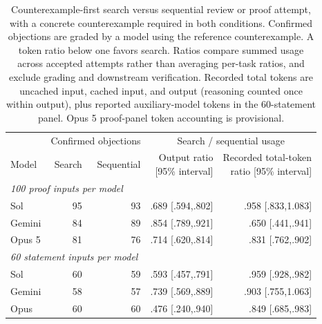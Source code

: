 \begin{table}[ht]
\centering\small\setlength{\tabcolsep}{4pt}
\begin{tabular}{@{}lrrrr@{}}
\toprule
 & \multicolumn{2}{c}{Confirmed objections} & \multicolumn{2}{c}{Search / sequential usage}\\
\cmidrule(lr){2-3}\cmidrule(l){4-5}
Model & Search & Sequential & \shortstack{Output ratio\\{[95\% interval]}} & \shortstack{Recorded total-token\\ratio {[95\% interval]}}\\
\midrule
\multicolumn{5}{l}{\emph{100 proof inputs per model}}\\
Sol & 95 & 93 & .689 [.594,.802] & .958 [.833,1.083]\\
Gemini & 84 & 89 & .854 [.789,.921] & .650 [.441,.941]\\
Opus 5 & 81 & 76 & .714 [.620,.814] & .831 [.762,.902]\\
\midrule
\multicolumn{5}{l}{\emph{60 statement inputs per model}}\\
Sol & 60 & 59 & .593 [.457,.791] & .959 [.928,.982]\\
Gemini & 58 & 57 & .739 [.569,.889] & .903 [.755,1.063]\\
Opus & 60 & 60 & .476 [.240,.940] & .849 [.685,.983]\\
\bottomrule
\end{tabular}
\caption{Counterexample-first search versus sequential review or proof attempt, with a concrete counterexample required in both conditions. Confirmed objections are graded by a model using the reference counterexample. A token ratio below one favors search. Ratios compare summed usage across accepted attempts rather than averaging per-task ratios, and exclude grading and downstream verification. Recorded total tokens are uncached input, cached input, and output (reasoning counted once within output), plus reported auxiliary-model tokens in the 60-statement panel. Opus 5 proof-panel token accounting is provisional.}
\label{tab:instruction-main}
\end{table}
